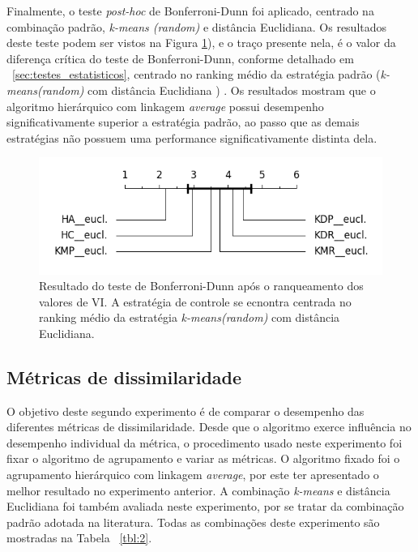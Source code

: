Finalmente, o teste \emph{post-hoc} de Bonferroni-Dunn foi aplicado, 
centrado na combinação padrão, \emph{k-means (random)} e distância Euclidiana. Os resultados 
deste teste podem ser vistos na Figura \ref{fig:VIP1}), e o traço presente nela,  é o valor da diferença crítica do teste de Bonferroni-Dunn, conforme detalhado em ~\ref{sec:testes_estatisticos}, centrado no ranking médio da estratégia padrão (\emph{k-means(random)} com distância Euclidiana ) . Os resultados mostram que o algoritmo hierárquico 
com linkagem \emph{average} possui desempenho significativamente superior 
a estratégia padrão, ao passo que as demais estratégias não possuem uma performance significativamente distinta dela.
\begin{figure}[h!]
	\includegraphics[width=\linewidth]{figuras/figure_combinacoes_1.png}
	\caption{Resultado do teste de Bonferroni-Dunn após o ranqueamento dos valores de VI. A estratégia de controle se ecnontra centrada no ranking médio da estratégia \emph{k-means(random)} com distância Euclidiana.}
	\label{fig:VIP1}
\end{figure}

\subsection{Métricas de dissimilaridade} \label{exp:2}

O objetivo deste segundo experimento é de comparar o desempenho
das diferentes métricas de dissimilaridade. Desde que o algoritmo exerce 
influência no desempenho individual da métrica, o procedimento usado 
neste experimento foi fixar o algoritmo de agrupamento 
e variar as métricas. O algoritmo fixado foi o agrupamento 
hierárquico com linkagem \emph{average}, por este ter apresentado o melhor 
resultado no experimento anterior. A combinação \emph{k-means} e 
distância Euclidiana foi também avaliada neste experimento, por se tratar 
da combinação padrão adotada na literatura. Todas as combinações 
deste experimento são mostradas na Tabela ~\ref{tbl:2}. 

